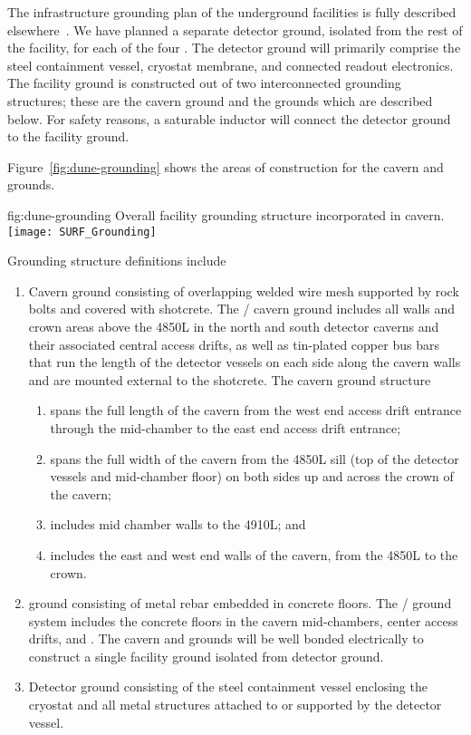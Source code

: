 The infrastructure grounding plan of the underground facilities is
fully described elsewhere~\cite{bib:cernedms2095975}. %
We have planned a separate detector ground, isolated from the rest of the facility, for each of the four .    
The detector ground will primarily 
comprise the steel containment vessel, cryostat membrane, and
connected readout electronics.  The facility ground is constructed out
of two interconnected grounding structures; these are the cavern
ground and the  grounds which are described below.  For safety
reasons, a saturable inductor will connect the detector ground to the
facility ground.

Figure~\ref{fig:dune-grounding} shows the areas of construction for
the cavern and  grounds.
\begin{dunefigure}{fig:dune-grounding}
  {Overall  facility grounding structure incorporated in cavern.}
  \texttt{[image: SURF\_Grounding]}
\end{dunefigure}
Grounding structure definitions include 
\begin{enumerate}
 \item Cavern ground consisting of overlapping welded wire mesh
   supported by rock bolts and covered with shotcrete. The
   / cavern ground includes all walls and
   crown areas above the 4850L in the north and south detector
   caverns and their associated central access drifts, as well as tin-plated
   copper bus bars that run the length of the detector vessels
   on each side along the cavern walls and are mounted external to the
   shotcrete.  The cavern ground structure
\begin{enumerate}
 \item spans the full length of the cavern from the west end access
   drift entrance through the mid-chamber to the east end access drift
   entrance;
 \item spans the full width of the cavern from the 4850L sill
   (top of the detector vessels and mid-chamber floor) on both sides
   up and across the crown of the cavern;
 \item includes mid chamber walls to the 4910L; and 
 \item includes the east and west end walls of the cavern, from the
   4850L to the crown.
\end{enumerate}
 \item {} ground consisting of metal rebar embedded in
   concrete floors. The /  ground
   system includes the concrete floors in the cavern mid-chambers,
   center access drifts, and . The cavern and
    grounds will be well bonded electrically to construct
   a single facility ground isolated from detector ground.
 \item Detector ground consisting of the steel containment vessel
   enclosing the cryostat and all metal structures attached to or
   supported by the detector vessel.
\end{enumerate}



